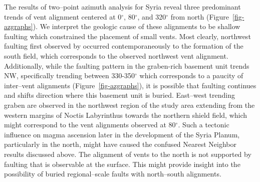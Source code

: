 The results of two--point azimuth analysis for Syria reveal three predominant trends of vent alignment centered at 0$^{\circ}$, 80$^{\circ}$, and 320$^{\circ}$ from north (Figure~\ref{fig-azgraphs}). We interpret the geologic cause of these alignments to be shallow faulting which constrained the placement of small vents. Most clearly, northwest faulting first observed by \citet{Baptista2008} occurred contemporaneously to the formation of the south field, which corresponds to the observed northwest vent alignment. Additionally, while the faulting pattern in the graben-rich basement unit trends NW, specifically trending between 330-350$^{\circ}$ which corresponds to a paucity of inter--vent alignments (Figure~\ref{fig-azgraphs}), it is possible that faulting continues and shifts direction where this basement unit is buried. East--west trending graben are observed in the northwest region of the study area extending from the western margins of Noctis Labyrinthus towards the northern shield field, which might correspond to the vent alignments observed at 80$^{\circ}$. Such a tectonic influence on magma ascension later in the development of the Syria Planum, particularly in the north, might have caused the confused Nearest Neighbor results discussed above. The alignment of vents to the north is not supported by faulting that is observable at the surface. This might provide insight into the possibility of buried regional--scale faults with north--south alignments.

